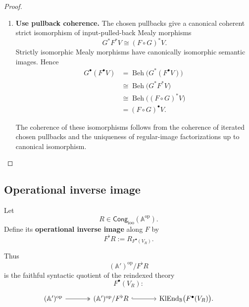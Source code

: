 \begin{proof}
\begin{enumerate}
        \item \textbf{Use pullback coherence.}
        The chosen pullbacks give a canonical coherent strict isomorphism of
        input-pulled-back Mealy morphisms
        \[
            G^*F^*V
            \cong
            (F\circ G)^*V.
        \]
        Strictly isomorphic Mealy morphisms have canonically isomorphic
        semantic images. Hence
        \[
        \begin{aligned}
            G^\bullet(F^\bullet V)
            &=
            \operatorname{Beh}
            \bigl(
                G^*(F^\bullet V)
            \bigr)
            \\
            &\cong
            \operatorname{Beh}
            \bigl(
                G^*F^*V
            \bigr)
            \\
            &\cong
            \operatorname{Beh}
            \bigl(
                (F\circ G)^*V
            \bigr)
            \\
            &=
            (F\circ G)^\bullet V.
        \end{aligned}
        \]

        The coherence of these isomorphisms follows from the coherence of
        iterated chosen pullbacks and the uniqueness of regular-image
        factorizations up to canonical isomorphism.
    \end{enumerate}
\end{proof}

\subsection{Operational inverse image}
\label{subsec:to-operational-inverse-image}

\begin{definition}
\label{def:to-Fflat}
    Let
    \[
        R\in
        \mathsf{Cong}_{\mathrm{ioo}}(\mathbb A^{\mathrm{op}}).
    \]
    Define its \textbf{operational inverse image} along \(F\) by
    \[
        F^\flat R
        :=
        R_{F^\bullet(V_R)}.
    \]
\end{definition}

Thus
\[
    (\mathbb A')^{\mathrm{op}}/F^\flat R
\]
is the faithful syntactic quotient of the reindexed theory
\[
    F^\bullet(V_R):
\]
\[
\begin{tikzcd}[column sep=large]
    (\mathbb A')^{\mathrm{op}}
        \arrow[r, two heads]
    &
    (\mathbb A')^{\mathrm{op}}/F^\flat R
        \arrow[r, hook]
    &
    \operatorname{KlEnd}_{\mathbb B}
    \bigl(F^\bullet(V_R)\bigr).
\end{tikzcd}
\]

